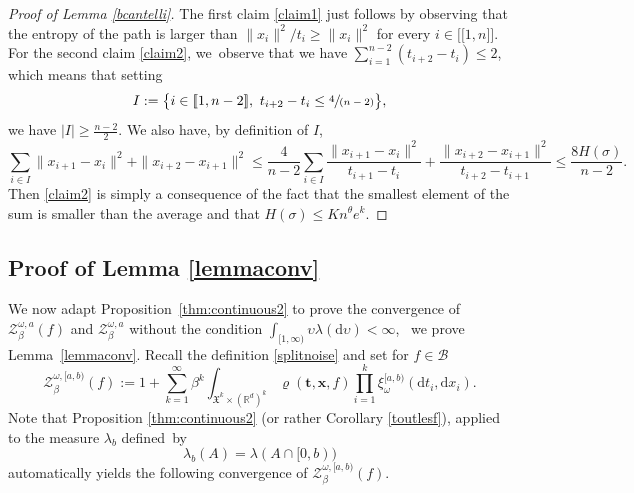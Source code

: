 \documentclass[10pt]{amsart}
\let\mathcal\mathscr
\newcommand{\spfrac}[2]{\sfrac{#1}{(#2)}}
\newcommand{\lint}{\mathopen{[\![}}
\newcommand{\rint}{\mathclose{]\!]}}
\theoremstyle{definition}
\newcommand{\bt}{\boldsymbol{t}}
\newcommand{\bx}{\boldsymbol{x}}
\newcommand{\dd}{\mathrm{d}}
\newcommand{\cB}{{\ensuremath{\mathcal B}} }
\newcommand{\cZ}{{\ensuremath{\mathcal Z}} }
\newcommand{\bbR}{{\ensuremath{\mathbb R}} }
\let\gb\beta
\let\gl\lambda
\let\ups\upsilon
\let\go\omega
\begin{document}
\begin{proof}[Proof of Lemma \ref{bcantelli}]
The first claim \eqref{claim1} just follows by observing that the entropy of the path is
larger than $\|x_i\|^2/t_i \ge \|x_i\|^2$ for every $i\in \lint 1, n\rint$.
For the second claim \eqref{claim2}, we~observe that
we have
$\sum_{i=1}^{n-2}(t_{i+2}-t_i)\le 2$,
which means that setting
\[
I:= \bigl\{ i\in \lint 1,n-2\rint, \ t_{i+2}-t_i\le \spfrac{4 }{n-2} \bigr\},
\]
we have $|I|\ge \frac{n-2}{2}$. We also have, by definition of $I$,
\begin{equation*}
\sum_{i\in I} \|x_{i+1}-x_i \|^2+\|x_{i+2}-x_{i+1}\|^2\le \frac{4 }{n-2}
\sum_{i\in I}\frac{\|x_{i+1}-x_i\|^2}{t_{i+1}-t_i}+\frac{\|x_{i+2}-x_{i+1}\|^2}{t_{i+2} -t_{i+1}}
\le \frac{8 H(\sigma) }{n-2}.
\end{equation*}
Then \eqref{claim2} is simply a consequence of the fact that
the smallest element of the sum is smaller than the average
and that $H(\sigma) \leq K n^{\theta} e^k$.
\end{proof}

\subsection{Proof of Lemma \ref{lemmaconv}}
\label{sec:lemmaconv}

We now adapt Proposition~\ref{thm:continuous2}
to prove the convergence of $\cZ_{\gb}^{\go,a}(f)$ and $\cZ_{\gb}^{\go,a}$
without the condition $\int_{[1,\infty)} \ups \lambda(\dd \ups) <\infty$, \ie ~we prove Lemma~\ref{lemmaconv}.
Recall the definition \eqref{splitnoise}
and set for $f\in \cB$
\begin{equation}\label{trunkaparti}
\cZ^{\go,[a,b)}_{\beta}(f):=1+\sum_{k=1}^\infty \beta^k\int_{ \mathfrak{X}^k \times (\bbR^d)^k} \varrho(\bt, \bx, f) \prod_{i=1}^k \xi^{[a,b)}_{\go} (\dd t_i, \dd x_i).
\end{equation}
Note that Proposition \ref{thm:continuous2} (or rather Corollary \ref{toutlesf}), applied to the measure $\gl_b$ defined~by
\begin{equation}\label{glbdef}
\gl_b(A)=\gl(A\cap[0,b))
\end{equation}
automatically yields the following convergence of $\cZ^{\go,[a,b)}_{\beta}(f)$.
\end{document}
